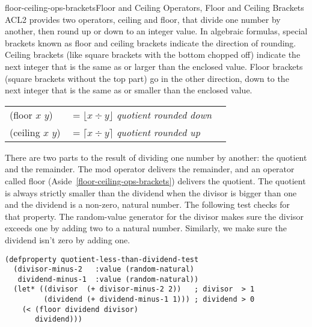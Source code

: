 \begin{aside}{floor-ceiling-ops-brackets}{Floor and Ceiling Operators, Floor and Ceiling Brackets}
ACL2 provides two operators,
\textsf{ceiling} and \textsf{floor}, that divide one number by another,
then round up or down to an integer value.
In algebraic formulas, special brackets known as
floor and ceiling brackets indicate the direction of rounding.
Ceiling brackets (like square brackets with the bottom chopped off)
indicate the next integer that is the same as or larger than
the enclosed value.
Floor brackets (square brackets without the top part)
go in the other direction, down to the next integer
that is the same as or smaller than the enclosed value.
\vspace{2mm}
\begin{center}
\begin{tabular}{lll}
\textsf{(floor $x$ $y$)}  & $= \lfloor x \div y \rfloor$ \emph{quotient rounded down} \vspace{1mm}\\
\textsf{(ceiling $x$ $y$)}& $= \lceil x  \div y \rceil $ \emph{quotient rounded up}   \\
\end{tabular}
\end{center}
\end{aside}

There are two parts to the result
of dividing one number by another: the quotient and the remainder.
The \textsf{mod} operator delivers the remainder,
and an operator called \textsf{floor} (Aside~\ref{floor-ceiling-ops-brackets})
delivers the quotient.
The quotient is always strictly smaller
than the dividend when the divisor is bigger than one
and the dividend is a non-zero, natural number.
The following test checks for that property.
The random-value generator for the divisor
makes sure the divisor exceeds one by adding two
to a natural number.
Similarly, we make sure the dividend isn't zero by adding one.

\label{quotient-less-than-dividend-test}
\begin{code}
\begin{verbatim}
(defproperty quotient-less-than-dividend-test
  (divisor-minus-2   :value (random-natural)
   dividend-minus-1  :value (random-natural))
  (let* ((divisor  (+ divisor-minus-2 2))   ; divisor  > 1
         (dividend (+ dividend-minus-1 1))) ; dividend > 0
    (< (floor dividend divisor)
       dividend)))
\end{verbatim}
\end{code}

